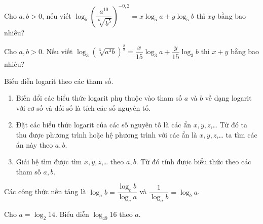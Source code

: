 \begin{bt}%
    Cho $a,b>0$, nếu viết $\log_5\displaystyle \left( \dfrac{a^{10}}{\sqrt[6]{b^5}}\right)^{-0,2}=x\log_5a+y\log_5b$ thì $xy$ bằng bao nhiêu?
\end{bt}
\begin{bt}%
    Cho $ a,b>0$. Nếu viết $\log_3\left(\sqrt[5]{a^3b} \right )^{\tfrac{2}{3}}=\dfrac{x}{15}\log_3a+\dfrac{y}{15}\log_3b$ thì $x+y$ bằng bao nhiêu?
\end{bt}

\begin{dang}{Biểu diễn logarit theo các tham số.}%
    \begin{enumerate}
        \item Biến đổi các biểu thức logarit phụ thuộc vào tham số $a$ và $b$ về dạng logarit với cơ số và đối số là tích các số nguyên tố.
        \item Đặt các biểu thức logarit của các số nguyên tố là các ẩn $x, y, z$,… Từ đó ta thu được phương trình hoặc hệ phương trình với các ẩn là $x, y, z$,… ta tìm các ẩn này theo $a, b$.
        \item Giải hệ tìm được tìm $x, y, z$,… theo $a, b$. Từ đó tính được biểu thức theo các tham số $a, b$.
    \end{enumerate}
    Các công thức nền tảng là $\log_a b = \dfrac{\log_c b}{\log_c a}$ và $\dfrac{1}{\log_a b}= \log_b a$. 
\end{dang}

\begin{vd}%
    Cho  $a=\log_2 14$. Biểu diễn $\log _{49} 16$ theo $a$.
\end{vd}

